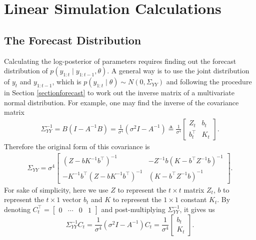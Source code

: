 \setcounter{figure}{1} 

\section{Linear Simulation Calculations}\label{linearcalculation}

\subsection*{The Forecast Distribution} 

Calculating the log-posterior of parameters requires finding out the forecast distribution of $p\left(y_{1:t}\mid y_{1:t-1},\theta\right)$. A general way is to use the joint distribution of $y_{t}$ and $y_{1:t-1}$, which is $p\left(y_{1:t}\mid \theta\right)\sim N\left(0,\Sigma_{YY}\right)$ and following the procedure in Section \ref{sectionforecast} to work out the inverse matrix of a multivariate normal distribution. For example, one may find the inverse of the covariance matrix 
\begin{align*}
\Sigma_{YY}^{-1} = B\left(I-A^{-1}B\right) =\frac{1}{\sigma^4}\left(\sigma^2 I-A^{-1}\right) \triangleq \frac{1}{\sigma^4}
\begin{bmatrix} 
Z_{t} & b_{t} \\
b_{t}^\top & K_{t}
\end{bmatrix}.
\end{align*}
Therefore the original form of this covariance is 
\begin{align*} \Sigma_{YY} =\sigma^4 
\begin{bmatrix}
\left(Z-bK^{-1}b^\top\right)^{-1} & -Z^{-1}b\left(K-b^\top Z^{-1}b\right)^{-1}\\
-K^{-1}b^\top \left(Z-bK^{-1}b^\top\right)^{-1} & \left(K-b^\top Z^{-1}b\right)^{-1}
\end{bmatrix}.
\end{align*}
For sake of simplicity, here we use $Z$ to represent the $t\times t$ matrix $Z_{t}$, $b$ to represent the $t \times 1$ vector $b_{t}$ and $K$ to represent the $1\times 1$ constant $K_{t}$. By denoting $C_{t}^\top = \begin{bmatrix} 0 & \cdots & 0 & 1\end{bmatrix}$ and post-multiplying $\Sigma_{YY}^{-1}$, it gives us 
\begin{equation}
\Sigma_{YY}^{-1} C_{t}= \frac{1}{\sigma^4}\left(\sigma^2 I-A^{-1}\right) C_{t}= \frac{1}{\sigma^4} \begin{bmatrix} b_{t} \\ K_{t} \end{bmatrix}.
\end{equation} 

